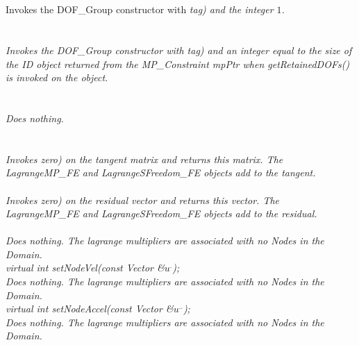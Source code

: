   \\
  \\
Invokes the DOF\_Group constructor with {\em tag) and the integer $1$. \\

  \\ \\
Invokes the DOF\_Group constructor with {\em tag) and an integer equal
to the size of the ID object returned from the MP\_Constraint {\em
mpPtr} when {\em getRetainedDOFs()} is invoked on the object. \\

  \\
  \\
Does nothing. \\

 \\
 \\
Invokes {\em zero{}) on the tangent matrix and returns this matrix. 
The LagrangeMP\_FE and LagrangeSFreedom\_FE objects add to the tangent. \\


\\
Invokes {\em zero{}) on the residual vector and returns this vector. 
The LagrangeMP\_FE and LagrangeSFreedom\_FE objects add to the residual. \\

 \\
Does nothing. The lagrange multipliers are associated with no Nodes
in the Domain. \\


{\em virtual int setNodeVel(const Vector \&$u^{.}$);}\\
Does nothing. The lagrange multipliers are associated with no Nodes
in the Domain. \\

{\em virtual int setNodeAccel(const Vector \&$u^{..}$);}\\
Does nothing. The lagrange multipliers are associated with no Nodes
in the Domain. \\

}}}}
